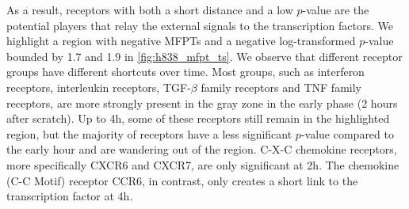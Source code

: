 As a result, receptors with both a short distance and a low
$p$-value are the potential players that relay the external
signals to the transcription factors. We highlight a region
with negative MFPTs and a negative log-transformed $p$-value
bounded by 1.7 and 1.9 in \ref{fig:h838_mfpt_ts}.
We observe that different receptor groups have different 
shortcuts over time.
Most groups, such as interferon receptors, interleukin 
receptors, TGF-$\beta$ family receptors and TNF family 
receptors, are more strongly present in the gray zone in
the early phase (2 hours after scratch). Up to 4h, some of
these receptors still remain in the highlighted region,
but the majority of receptors have a less significant
$p$-value compared to the early hour 
and are wandering out of the region.
C-X-C chemokine receptors, more specifically CXCR6 and CXCR7,
are only significant at 2h. The chemokine (C-C Motif) receptor
CCR6, in contrast, only creates a short link to the 
transcription factor at 4h.



